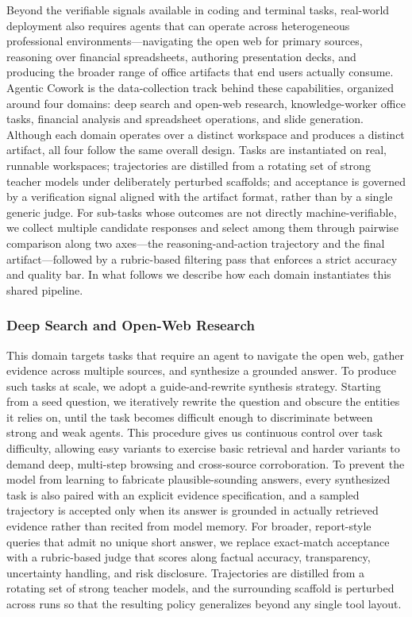 Beyond the verifiable signals available in coding and terminal tasks, real-world deployment also requires agents that can operate across heterogeneous professional environments---navigating the open web for primary sources, reasoning over financial spreadsheets, authoring presentation decks, and producing the broader range of office artifacts that end users actually consume. Agentic Cowork is the data-collection track behind these capabilities, organized around four domains: deep search and open-web research, knowledge-worker office tasks, financial analysis and spreadsheet operations, and slide generation. Although each domain operates over a distinct workspace and produces a distinct artifact, all four follow the same overall design. Tasks are instantiated on real, runnable workspaces; trajectories are distilled from a rotating set of strong teacher models under deliberately perturbed scaffolds; and acceptance is governed by a verification signal aligned with the artifact format, rather than by a single generic judge. For sub-tasks whose outcomes are not directly machine-verifiable, we collect multiple candidate responses and select among them through pairwise comparison along two axes---the reasoning-and-action trajectory and the final artifact---followed by a rubric-based filtering pass that enforces a strict accuracy and quality bar. In what follows we describe how each domain instantiates this shared pipeline.

\subsubsection{Deep Search and Open-Web Research}

This domain targets tasks that require an agent to navigate the open web, gather evidence across multiple sources, and synthesize a grounded answer. To produce such tasks at scale, we adopt a guide-and-rewrite synthesis strategy. Starting from a seed question, we iteratively rewrite the question and obscure the entities it relies on, until the task becomes difficult enough to discriminate between strong and weak agents. This procedure gives us continuous control over task difficulty, allowing easy variants to exercise basic retrieval and harder variants to demand deep, multi-step browsing and cross-source corroboration. To prevent the model from learning to fabricate plausible-sounding answers, every synthesized task is also paired with an explicit evidence specification, and a sampled trajectory is accepted only when its answer is grounded in actually retrieved evidence rather than recited from model memory. For broader, report-style queries that admit no unique short answer, we replace exact-match acceptance with a rubric-based judge that scores along factual accuracy, transparency, uncertainty handling, and risk disclosure. Trajectories are distilled from a rotating set of strong teacher models, and the surrounding scaffold is perturbed across runs so that the resulting policy generalizes beyond any single tool layout.

